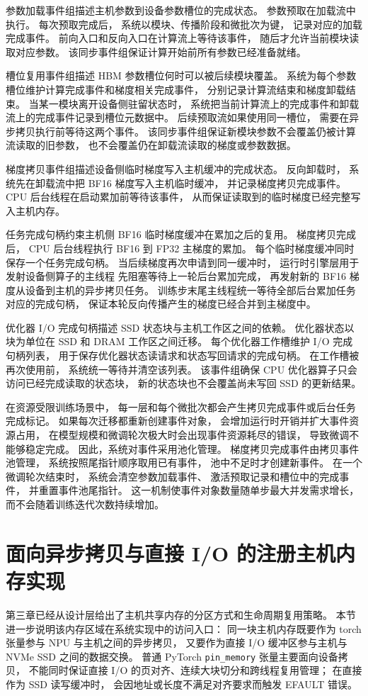 \documentclass[bachelor,openany,oneside,color,AutoFakeBold=true]{buaathesis}
\begin{document}
参数加载事件组描述主机参数到设备参数槽位的完成状态。
参数预取在加载流中执行。
每次预取完成后，
系统以模块、传播阶段和微批次为键，
记录对应的加载完成事件。
前向入口和反向入口在计算流上等待该事件，
随后才允许当前模块读取对应参数。
该同步事件组保证计算开始前所有参数已经准备就绪。

槽位复用事件组描述 HBM 参数槽位何时可以被后续模块覆盖。
系统为每个参数槽位维护计算完成事件和梯度相关完成事件，
分别记录计算流结束和梯度卸载结束。
当某一模块离开设备侧驻留状态时，
系统把当前计算流上的完成事件和卸载流上的完成事件记录到槽位元数据中。
后续预取流如果使用同一槽位，
需要在异步拷贝执行前等待这两个事件。
该同步事件组保证新模块参数不会覆盖仍被计算流读取的旧参数，
也不会覆盖仍在卸载流读取的梯度或参数数据。

梯度拷贝事件组描述设备侧临时梯度写入主机缓冲的完成状态。
反向卸载时，
系统先在卸载流中把 BF16 梯度写入主机临时缓冲，
并记录梯度拷贝完成事件。
CPU 后台线程在启动累加前等待该事件，
从而保证读取到的临时梯度已经完整写入主机内存。

任务完成句柄约束主机侧 BF16 临时梯度缓冲在累加之后的复用。
梯度拷贝完成后，
CPU 后台线程执行 BF16 到 FP32 主梯度的累加。
每个临时梯度缓冲同时保存一个任务完成句柄。
当后续梯度再次申请到同一缓冲时，
运行时引擎层用于发射设备侧算子的主线程
先阻塞等待上一轮后台累加完成，
再发射新的 BF16 梯度从设备到主机的异步拷贝任务。
训练步末尾主线程统一等待全部后台累加任务对应的完成句柄，
保证本轮反向传播产生的梯度已经合并到主梯度中。

优化器 I/O 完成句柄描述 SSD 状态块与主机工作区之间的依赖。
优化器状态以块为单位在 SSD 和 DRAM 工作区之间迁移。
每个优化器工作槽维护 I/O 完成句柄列表，
用于保存优化器状态读请求和状态写回请求的完成句柄。
在工作槽被再次使用前，
系统统一等待并清空该列表。
该事件组确保 CPU 优化器算子只会访问已经完成读取的状态块，
新的状态块也不会覆盖尚未写回 SSD 的更新结果。

在资源受限训练场景中，
每一层和每个微批次都会产生拷贝完成事件或后台任务完成标记。
如果每次迁移都重新创建事件对象，
会增加运行时开销并扩大事件资源占用，
在模型规模和微调轮次极大时会出现事件资源耗尽的错误，
导致微调不能够稳定完成。
因此，系统对事件采用池化管理。
梯度拷贝完成事件由拷贝事件池管理，
系统按照尾指针顺序取用已有事件，
池中不足时才创建新事件。
在一个微调轮次结束时，
系统会清空参数加载事件、
激活预取记录和槽位中的完成事件，
并重置事件池尾指针。
这一机制使事件对象数量随单步最大并发需求增长，
而不会随着训练迭代次数持续增加。

\section{面向异步拷贝与直接 I/O 的注册主机内存实现}
第三章已经从设计层给出了主机共享内存的分区方式和生命周期复用策略。
本节进一步说明该内存区域在系统实现中的访问入口：
同一块主机内存既要作为 torch 张量参与 NPU 与主机之间的异步拷贝，
又要作为直接 I/O 缓冲区参与主机与 NVMe SSD 之间的数据交换。
普通 PyTorch \texttt{pin\_memory} 张量主要面向设备拷贝，
不能同时保证直接 I/O 的页对齐、连续大块切分和跨线程复用管理；
在直接作为 SSD 读写缓冲时，
会因地址或长度不满足对齐要求而触发 EFAULT 错误。
\end{document}
